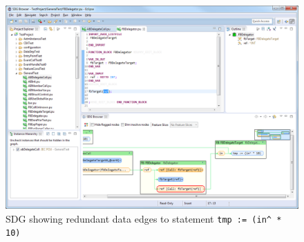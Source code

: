\begin{figure}[hpb]
  \centering
    \includegraphics[width=\textwidth]{bilder/manual-ci3}
  \caption[SDG showing redundant data edges]
    {SDG showing redundant data edges to statement \lstinline|tmp := (in^ * 10)|}
  \label{fig:manual-ci3}
\end{figure}

